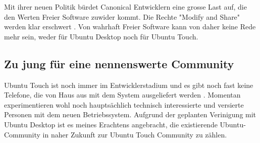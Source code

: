 Mit ihrer neuen Politik bürdet Canonical Entwicklern eine grosse Last auf, die den Werten Freier Software zuwider kommt. Die Rechte "Modify and Share" werden klar erschwert \cite{online:ubuntutouch-mjgLicense}. Von wahrhaft Freier Software kann von daher keine Rede mehr sein, weder für Ubuntu Desktop noch für Ubuntu Touch.

\subsection{Zu jung für eine nennenswerte Community}
Ubuntu Touch ist noch immer im Entwicklerstadium und es gibt noch fast keine Telefone, die von Haus aus mit dem System ausgeliefert werden \cite{online:ubuntutouch-wikipedia}. Momentan experimentieren wohl noch hauptsächlich technisch interessierte und versierte Personen mit dem neuen Betriebssystem. Aufgrund der geplanten Verinigung mit Ubuntu Desktop ist es meines Erachtens angebracht, die existierende Ubuntu-Community in naher Zukunft zur Ubuntu Touch Community zu zählen.